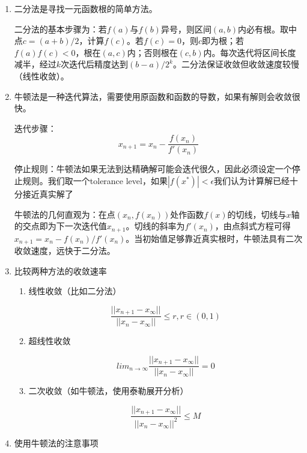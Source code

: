\documentclass[
]{book}
\begin{document}
\begin{enumerate}
\def\labelenumi{\arabic{enumi}.}
\item
  二分法是寻找一元函数根的简单方法。

  二分法的基本步骤为：若\(f(a)\)与\(f(b)\)异号，则区间\((a, b)\)内必有根。取中点\(c = (a+b)/2\)，计算\(f(c)\)。若\(f(c) = 0\)，则\(c\)即为根；若\(f(a)f(c) < 0\)，根在\((a, c)\)内；否则根在\((c, b)\)内。每次迭代将区间长度减半，经过\(k\)次迭代后精度达到\((b-a)/2^k\)。二分法保证收敛但收敛速度较慢（线性收敛）。
\item
  牛顿法是一种迭代算法，需要使用原函数和函数的导数，如果有解则会收敛很快。

  迭代步骤： \[
    x_{n+1} = x_n - \frac{f(x_n)}{f'(x_n)}
    \]

  停止规则：牛顿法如果无法到达精确解可能会迭代很久，因此必须设定一个停止规则。我们取一个tolerance level，如果\(|f(x^*)|<\epsilon\)我们认为计算解已经十分接近真实解了

  牛顿法的几何直观为：在点\((x_n, f(x_n))\)处作函数\(f(x)\)的切线，切线与\(x\)轴的交点即为下一次迭代值\(x_{n+1}\)。切线的斜率为\(f'(x_n)\)，由点斜式方程可得\(x_{n+1} = x_n - f(x_n)/f'(x_n)\)。当初始值足够靠近真实根时，牛顿法具有二次收敛速度，远快于二分法。
\item
  比较两种方法的收敛速率

  \begin{enumerate}
  \def\labelenumii{\arabic{enumii}.}
  \item
    线性收敛（比如二分法）

    \[
    \frac{||x_{n+1}-x_{\infty}||}{||x_n-x_{\infty}||}\leq r,r \in (0,1)
    \]
  \item
    超线性收敛

    \[
    lim_{n\rightarrow\infty}\frac{||x_{n+1}-x_{\infty}||}{||x_n-x_{\infty}||}=0
    \]
  \item
    二次收敛（如牛顿法，使用泰勒展开分析）

    \[
    \frac{||x_{n+1}-x_{\infty}||}{||x_n-x_{\infty}||^2}\leq M
    \]
  \end{enumerate}
\item
  使用牛顿法的注意事项


\end{enumerate}
\end{document}
